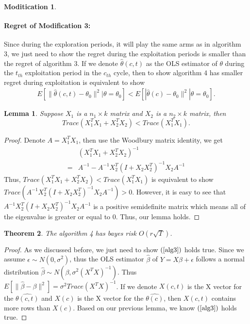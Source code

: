 \documentclass{article}
\newtheorem{theorem}{Theorem}
\newtheorem{lemma}[theorem]{Lemma}
\theoremstyle{plain}
\theoremstyle{definition}
\newtheorem{modification}{Moditication}
\begin{document}
\begin{modification}
\paragraph{Regret of Modification 3:}
Since during the exploration periods, it will play the same arms as in algorithm 3, we just need to show the regret during the exploitation periods is smaller than the regret of algorithm 3. If we denote $\hat{\theta}(c,t)$ as the OLS estimator of $\theta$ during the $t_{th}$ exploitation period in the $c_{th}$ cycle, then to show algorithm 4 has smaller regret during exploitation is equivalent to show 
\begin{align}
E[\|\hat{\theta}(c,t)-\theta_{0}\|^{2}|\theta=\theta_{0}] < E[|\hat{\theta}(c)-\theta_{0}\|^{2}|\theta=\theta_{0}]. \label{alg3}
\end{align}
\begin{lemma}
Suppose $X_{1}$ is a $n_{1}\times k $ matrix and $X_{2}$ is a $n_{2}\times k$ matrix, then
\begin{equation}
Trace(X_{1}^{T}X_{1}+X_{2}^{T}X_{2}) < Trace(X_{1}^{T}X_{1}). \nonumber
\end{equation}
\end{lemma}
\begin{proof}
Denote $A=X_{1}^{T}X_{1}$, then use the Woodbury matrix identity, we get
\begin{align}
&(X_{1}^{T}X_{1}+X_{2}^{T}X_{2})^{-1} \nonumber \\
=& A^{-1}-A^{-1}X_{2}^{T}(I+X_{2}X_{2}^{T})^{-1}X_{2}A^{-1} \nonumber 
\end{align}
Thus, $Trace(X_{1}^{T}X_{1}+X_{2}^{T}X_{2}) < Trace(X_{1}^{T}X_{1})$ is equivalent to show $Trace(A^{-1}X_{2}^{T}(I+X_{2}X_{2}^{T})^{-1}X_{2}A^{-1})>0$. However, it is easy to see that $A^{-1}X_{2}^{T}(I+X_{2}X_{2}^{T})^{-1}X_{2}A^{-1}$ is a positive semidefinite matrix which means all of the eigenvalue is greater or equal to 0. Thus, our lemma holds.
\end{proof}

\begin{theorem}
The algorithm 4 has bayes risk $O(r\sqrt{T})$.
\end{theorem}
\begin{proof}
As we discussed before, we just need to show $(\ref{alg3})$ holds true. Since we assume $\epsilon\sim N(0,\sigma^{2})$, thus the OLS estimator $\hat{\beta}$ of $Y=X\beta+\epsilon$ follows a normal distribution $\hat{\beta}\sim N(\beta,\sigma^{2}(X^{T}X)^{-1})$. Thus $E[\|\hat{\beta}-\beta\|^{2}]=\sigma^{2}Trace(X^{T}X)^{-1}$. If we denote $X(c,t)$ is the X vector for the $\hat{\theta(c,t)}$ and $X(c)$ is the X vector for the $\hat{\theta(c)}$, then $X(c,t)$ contains more rows than $X(c)$. Based on our previous lemma, we know $(\ref{alg3})$ holds true.
\end{proof}


\end{modification}
\end{document}
